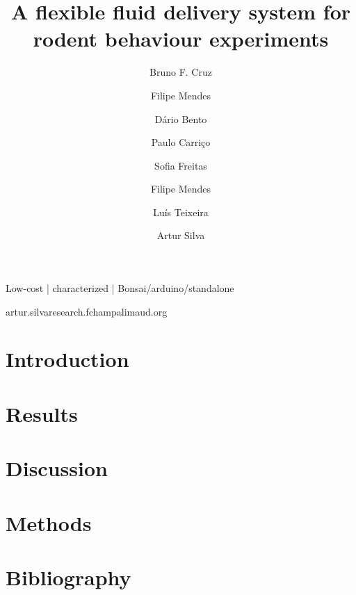 
\title{A flexible fluid delivery system for rodent behaviour experiments}
\shorttitle{}

\author[1,2,3]{Bruno F. Cruz}
\author[2]{Filipe Mendes}
\author[2]{Dário Bento}
\author[2]{Paulo Carriço}
\author[2]{Sofia Freitas}
\author[2]{Filipe Mendes}
\author[2]{Luís Teixeira}
\author[1,\Letter]{Artur Silva}
\date{}

\maketitle

\begin{abstract}


\end{abstract}

\begin{keywords}
Low-cost | characterized | Bonsai/arduino/standalone
\end{keywords}

\begin{corrauthor}
artur.silva\at research.fchampalimaud.org
\end{corrauthor}

\section*{Introduction}\label{s:introduction}


\section*{Results}\label{s:results}


\section*{Discussion}\label{s:discussion}


\section*{Methods}\label{s:methods}


\section*{Bibliography}



